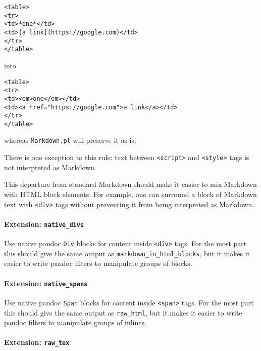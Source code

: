 \documentclass[]{article}
\begin{document}
\begin{verbatim}
<table>
<tr>
<td>*one*</td>
<td>[a link](https://google.com)</td>
</tr>
</table>
\end{verbatim}

into

\begin{verbatim}
<table>
<tr>
<td><em>one</em></td>
<td><a href="https://google.com">a link</a></td>
</tr>
</table>
\end{verbatim}

whereas \texttt{Markdown.pl} will preserve it as is.

There is one exception to this rule: text between
\texttt{\textless{}script\textgreater{}} and
\texttt{\textless{}style\textgreater{}} tags is not interpreted as
Markdown.

This departure from standard Markdown should make it easier to mix
Markdown with HTML block elements. For example, one can surround a block
of Markdown text with \texttt{\textless{}div\textgreater{}} tags without
preventing it from being interpreted as Markdown.

\hypertarget{extension-native_divs}{%
\paragraph{\texorpdfstring{Extension:
\texttt{native\_divs}}{Extension: native\_divs}}\label{extension-native_divs}}

Use native pandoc \texttt{Div} blocks for content inside
\texttt{\textless{}div\textgreater{}} tags. For the most part this
should give the same output as \texttt{markdown\_in\_html\_blocks}, but
it makes it easier to write pandoc filters to manipulate groups of
blocks.

\hypertarget{extension-native_spans}{%
\paragraph{\texorpdfstring{Extension:
\texttt{native\_spans}}{Extension: native\_spans}}\label{extension-native_spans}}

Use native pandoc \texttt{Span} blocks for content inside
\texttt{\textless{}span\textgreater{}} tags. For the most part this
should give the same output as \texttt{raw\_html}, but it makes it
easier to write pandoc filters to manipulate groups of inlines.

\hypertarget{extension-raw_tex}{%
\paragraph{\texorpdfstring{Extension:
\texttt{raw\_tex}}{Extension: raw\_tex}}\label{extension-raw_tex}}
\end{document}
